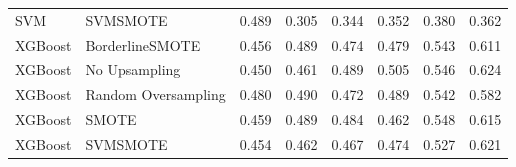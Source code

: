 \begin{tabular}{llllllll}
                            SVM &                      SVMSMOTE & 0.489 &                     0.305 &                 0.344 &                  0.352 &                                   0.380 &     0.362 \\
                        XGBoost &               BorderlineSMOTE & 0.456 &                     0.489 &                 0.474 &                  0.479 &                                   0.543 &     0.611 \\
                        XGBoost &                 No Upsampling & 0.450 &                     0.461 &                 0.489 &                  0.505 &                                   0.546 &     0.624 \\
                        XGBoost &           Random Oversampling & 0.480 &                     0.490 &                 0.472 &                  0.489 &                                   0.542 &     0.582 \\
                        XGBoost &                         SMOTE & 0.459 &                     0.489 &                 0.484 &                  0.462 &                                   0.548 &     0.615 \\
                        XGBoost &                      SVMSMOTE & 0.454 &                     0.462 &                 0.467 &                  0.474 &                                   0.527 &     0.621 \\
\bottomrule
\end{tabular}
